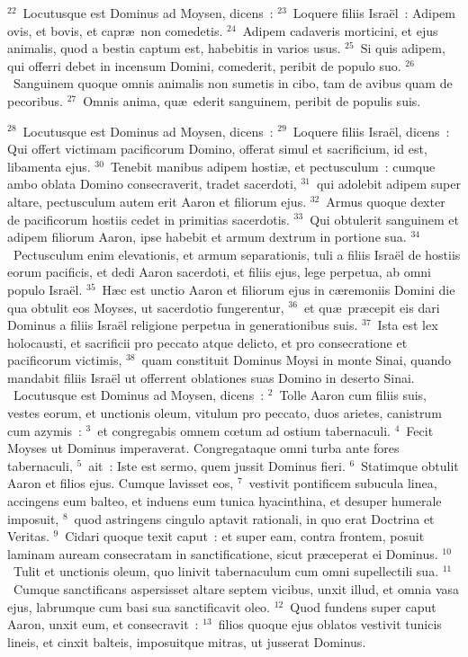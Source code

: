 ${}^{22}$~Locutusque est Dominus ad Moysen, dicens~:
${}^{23}$~Loquere filiis Isra\"el~: Adipem ovis, et bovis, et capr\ae\ non comedetis.
${}^{24}$~Adipem cadaveris morticini, et ejus animalis, quod a bestia captum est, habebitis in varios usus.
${}^{25}$~Si quis adipem, qui offerri debet in incensum Domini, comederit, peribit de populo suo.
${}^{26}$~Sanguinem quoque omnis animalis non sumetis in cibo, tam de avibus quam de pecoribus.
${}^{27}$~Omnis anima, qu\ae\ ederit sanguinem, peribit de populis suis.


${}^{28}$~Locutusque est Dominus ad Moysen, dicens~:
${}^{29}$~Loquere filiis Isra\"el, dicens~: Qui offert victimam pacificorum Domino, offerat simul et sacrificium, id est, libamenta ejus.
${}^{30}$~Tenebit manibus adipem hosti\ae , et pectusculum~: cumque ambo oblata Domino consecraverit, tradet sacerdoti,
${}^{31}$~qui adolebit adipem super altare, pectusculum autem erit Aaron et filiorum ejus.
${}^{32}$~Armus quoque dexter de pacificorum hostiis cedet in primitias sacerdotis.
${}^{33}$~Qui obtulerit sanguinem et adipem filiorum Aaron, ipse habebit et armum dextrum in portione sua.
${}^{34}$~Pectusculum enim elevationis, et armum separationis, tuli a filiis Isra\"el de hostiis eorum pacificis, et dedi Aaron sacerdoti, et filiis ejus, lege perpetua, ab omni populo Isra\"el.
${}^{35}$~H\ae c est unctio Aaron et filiorum ejus in c\ae remoniis Domini die qua obtulit eos Moyses, ut sacerdotio fungerentur,
${}^{36}$~et qu\ae\ pr\ae cepit eis dari Dominus a filiis Isra\"el religione perpetua in generationibus suis.
${}^{37}$~Ista est lex holocausti, et sacrificii pro peccato atque delicto, et pro consecratione et pacificorum victimis,
${}^{38}$~quam constituit Dominus Moysi in monte Sinai, quando mandabit filiis Isra\"el ut offerrent oblationes suas Domino in deserto Sinai.
~Locutusque est Dominus ad Moysen, dicens~:
${}^{2}$~Tolle Aaron cum filiis suis, vestes eorum, et unctionis oleum, vitulum pro peccato, duos arietes, canistrum cum azymis~:
${}^{3}$~et congregabis omnem cœtum ad ostium tabernaculi.
${}^{4}$~Fecit Moyses ut Dominus imperaverat. Congregataque omni turba ante fores tabernaculi,
${}^{5}$~ait~: Iste est sermo, quem jussit Dominus fieri.
${}^{6}$~Statimque obtulit Aaron et filios ejus. Cumque lavisset eos,
${}^{7}$~vestivit pontificem subucula linea, accingens eum balteo, et induens eum tunica hyacinthina, et desuper humerale imposuit,
${}^{8}$~quod astringens cingulo aptavit rationali, in quo erat Doctrina et Veritas.
${}^{9}$~Cidari quoque texit caput~: et super eam, contra frontem, posuit laminam auream consecratam in sanctificatione, sicut pr\ae ceperat ei Dominus.
${}^{10}$~Tulit et unctionis oleum, quo linivit tabernaculum cum omni supellectili sua.
${}^{11}$~Cumque sanctificans aspersisset altare septem vicibus, unxit illud, et omnia vasa ejus, labrumque cum basi sua sanctificavit oleo.
${}^{12}$~Quod fundens super caput Aaron, unxit eum, et consecravit~:
${}^{13}$~filios quoque ejus oblatos vestivit tunicis lineis, et cinxit balteis, imposuitque mitras, ut jusserat Dominus.


